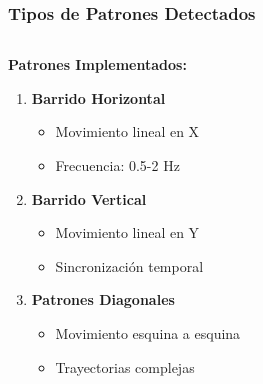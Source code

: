 \documentclass[xcolor=dvipsnames]{beamer}
\begin{document}
\begin{frame}
    \frametitle{Tipos de Patrones Detectados}
    \begin{columns}
        \begin{column}{0.5\textwidth}
            \textbf{Patrones Implementados:}
            \begin{enumerate}
                \item \textcolor{UniBlue}{\textbf{Barrido Horizontal}}
                \begin{itemize}
                    \item Movimiento lineal en X
                    \item Frecuencia: 0.5-2 Hz
                \end{itemize}
                
                \item \textcolor{UniRed}{\textbf{Barrido Vertical}}
                \begin{itemize}
                    \item Movimiento lineal en Y
                    \item Sincronización temporal
                \end{itemize}
                
                \item \textcolor{UniGreen}{\textbf{Patrones Diagonales}}
                \begin{itemize}
                    \item Movimiento esquina a esquina
                    \item Trayectorias complejas
                \end{itemize}
                

\end{enumerate}
\end{column}
\end{columns}
\end{frame}
\end{document}
